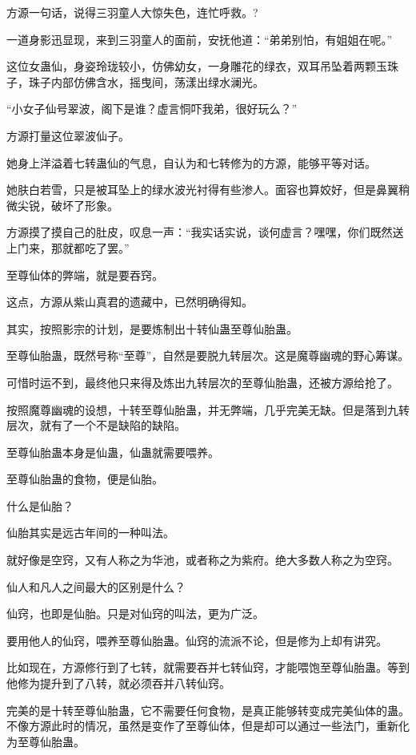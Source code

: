 
\begin{this_body}

方源一句话，说得三羽童人大惊失色，连忙呼救。?

一道身影迅显现，来到三羽童人的面前，安抚他道：“弟弟别怕，有姐姐在呢。”

这位女蛊仙，身姿玲珑较小，仿佛幼女，一身雕花的绿衣，双耳吊坠着两颗玉珠子，珠子内部仿佛含水，摇曳间，荡漾出绿水澜光。

“小女子仙号翠波，阁下是谁？虚言恫吓我弟，很好玩么？”

方源打量这位翠波仙子。

她身上洋溢着七转蛊仙的气息，自认为和七转修为的方源，能够平等对话。

她肤白若雪，只是被耳坠上的绿水波光衬得有些渗人。面容也算姣好，但是鼻翼稍微尖锐，破坏了形象。

方源摸了摸自己的肚皮，叹息一声：“我实话实说，谈何虚言？嘿嘿，你们既然送上门来，那就都吃了罢。”

至尊仙体的弊端，就是要吞窍。

这点，方源从紫山真君的遗藏中，已然明确得知。

其实，按照影宗的计划，是要炼制出十转仙蛊至尊仙胎蛊。

至尊仙胎蛊，既然号称“至尊”，自然是要脱九转层次。这是魔尊幽魂的野心筹谋。

可惜时运不到，最终他只来得及炼出九转层次的至尊仙胎蛊，还被方源给抢了。

按照魔尊幽魂的设想，十转至尊仙胎蛊，并无弊端，几乎完美无缺。但是落到九转层次，就有了一个不是缺陷的缺陷。

至尊仙胎蛊本身是仙蛊，仙蛊就需要喂养。

至尊仙胎蛊的食物，便是仙胎。

什么是仙胎？

仙胎其实是远古年间的一种叫法。

就好像是空窍，又有人称之为华池，或者称之为紫府。绝大多数人称之为空窍。

仙人和凡人之间最大的区别是什么？

仙窍，也即是仙胎。只是对仙窍的叫法，更为广泛。

要用他人的仙窍，喂养至尊仙胎蛊。仙窍的流派不论，但是修为上却有讲究。

比如现在，方源修行到了七转，就需要吞并七转仙窍，才能喂饱至尊仙胎蛊。等到他修为提升到了八转，就必须吞并八转仙窍。

完美的是十转至尊仙胎蛊，它不需要任何食物，是真正能够转变成完美仙体的蛊。不像方源此时的情况，虽然是变作了至尊仙体，但是却可以通过一些法门，重新化为至尊仙胎蛊。


\end{this_body}
